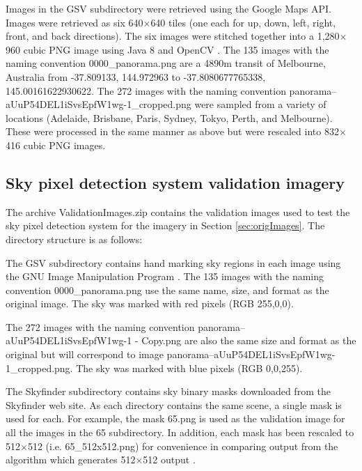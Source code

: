 \documentclass[final,3p,times,authoryear]{elsarticle}
\begin{document}
Images in the GSV subdirectory were retrieved using the Google Maps API. Images were retrieved as six 640$\times$640 tiles (one each for up, down, left, right, front, and back directions). The six images were stitched together into a 1,280$\times$960 cubic PNG image using Java 8 \citep{Oracle2018} and OpenCV \citep {Bradski2000}. The 135 images with the naming convention 0000\_panorama.png are a 4890m transit of Melbourne, Australia from -37.809133, 144.972963 to -37.8080677765338, 145.00161622930622. The 272 images with the naming convention  panorama--aUuP54DEL1iSvsEpfW1wg-1\_cropped.png were sampled from a variety of locations (Adelaide, Brisbane, Paris, Sydney, Tokyo, Perth, and Melbourne). These were processed in the same manner as above but were rescaled into 832$\times$416 cubic PNG images.

\subsection{Sky pixel detection system validation imagery}\label{sec:valImages}

The archive ValidationImages.zip contains the validation images used to test the \cite{Nice2019UC} sky pixel detection system for the imagery in Section \ref{sec:origImages}. The directory structure is as follows:



 

The GSV subdirectory contains hand marking sky regions in each image using the GNU Image Manipulation Program \citep{GIMP2019}. The 135 images with the naming convention 0000\_panorama.png use the same name, size, and format as the original image. The sky was marked with red pixels (RGB 255,0,0). 

The 272 images with the naming convention panorama--aUuP54DEL1iSvsEpfW1wg-1 - Copy.png are also the same size and format as the original but will correspond to image  panorama--aUuP54DEL1iSvsEpfW1wg-1\_cropped.png. The sky was marked with blue pixels (RGB 0,0,255).

The Skyfinder subdirectory contains sky binary masks downloaded from the Skyfinder web site. As each directory contains the same scene, a single mask is used for each. For example, the mask 65.png is used as the validation image for all the images in the 65 subdirectory. In addition, each mask has been rescaled to 512$\times$512 (i.e. 65\_512x512.png) for convenience in comparing output from the \cite{Middel2018} algorithm which generates 512$\times$512 output .
\end{document}
